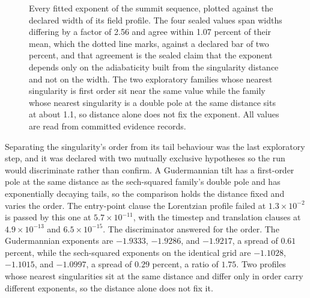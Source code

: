 \documentclass[aps,pre,reprint,nofootinbib,floatfix]{revtex4-2}
\begin{document}
\begin{figure}[t]
\centering
{}
\caption{Every fitted exponent of the summit sequence, plotted against
the declared width of its field profile.  The four sealed values span
widths differing by a factor of 2.56 and agree within 1.07 percent of
their mean, which the dotted line marks, against a declared bar of two
percent, and that agreement is the sealed
claim that the exponent depends only on the adiabaticity built from the
singularity distance and not on the width.  The two exploratory
families whose nearest singularity is first order sit near the same
value while the family whose nearest singularity is a double pole at
the same distance sits at about 1.1, so distance alone does not fix the
exponent.  All values are read from committed evidence records.}
\label{fig:summit}
\end{figure}

Separating the singularity's order from its tail behaviour was the last
exploratory step, and it was declared with two mutually exclusive
hypotheses so the run would discriminate rather than confirm.  A
Gudermannian tilt has a first-order pole at the same distance as the
sech-squared family's double pole and has exponentially decaying tails,
so the comparison holds the distance fixed and varies the order.  The
entry-point clause the Lorentzian profile failed at
$1.3 \times 10^{-2}$ is passed by this one at $5.7 \times 10^{-11}$,
with the timestep and translation clauses at $4.9 \times 10^{-13}$ and
$6.5 \times 10^{-15}$.  The discriminator answered for the order.  The
Gudermannian exponents are $-1.9333$, $-1.9286$, and $-1.9217$, a
spread of $0.61$ percent, while the sech-squared exponents on the
identical grid are $-1.1028$, $-1.1015$, and $-1.0997$, a spread of
$0.29$ percent, a ratio of $1.75$.  Two profiles whose nearest
singularities sit at the same distance and differ only in order carry
different exponents, so the distance alone does not fix it.
\end{document}
